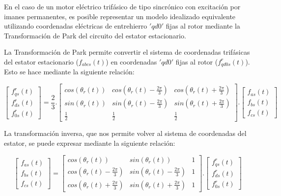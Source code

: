 \documentclass{article}
\begin{document}
    En el caso de un motor eléctrico trifásico de tipo sincrónico con excitación por imanes permanentes, 
    es posible representar un modelo idealizado equivalente utilizando coordenadas eléctricas de 
    entrehierro $'qd0'$ fijas al rotor mediante la Transformación de Park del circuito del estator 
    estacionario.

    La Transformación de Park permite convertir el sistema de coordenadas trifásicas del estator 
    estacionario ($f_{abcs}(t)$) en coordenadas $'qd0'$ fijas al rotor ($f^r_{qd0s}(t)$). Esto se hace 
    mediante la siguiente relación:

    \begin{equation}\label{eq:transformacion_de_park}
        \begin{bmatrix}
            f_{qs}^r(t)\\
            f_{ds}^r(t)\\
            f_{0s}^r(t)
        \end{bmatrix}
        =\frac{2}{3}.
        \begin{bmatrix}
            cos(\theta_r(t)) & cos(\theta_r(t) - \frac{2\pi}{3}) & cos(\theta_r(t) + \frac{2\pi}{3})\\
            sin(\theta_r(t)) & sin(\theta_r(t) - \frac{2\pi}{3}) & sin(\theta_r(t) + \frac{2\pi}{3})\\
            \frac{1}{2} & \frac{1}{2} & \frac{1}{2}
        \end{bmatrix}.
        \begin{bmatrix}
            f_{as}(t)\\
            f_{bs}(t)\\
            f_{cs}(t)
        \end{bmatrix}
    \end{equation}

    La transformación inversa, que nos permite volver al sistema de coordenadas del estator, se puede 
    expresar mediante la siguiente relación:
    
    \begin{equation}\label{eq:transformacion_de_park_inversa}
        \begin{bmatrix}
            f_{as}(t)\\
            f_{bs}(t)\\
            f_{cs}(t)
        \end{bmatrix}
        =
        \begin{bmatrix}
            cos(\theta_r(t)) & sin(\theta_r(t)) & 1\\
            cos(\theta_r(t) - \frac{2\pi}{3}) & sin(\theta_r(t) - \frac{2\pi}{3}) & 1\\
            cos(\theta_r(t) + \frac{2\pi}{3}) & sin(\theta_r(t) + \frac{2\pi}{3}) & 1
        \end{bmatrix}.
        \begin{bmatrix}
            f_{qs}^r(t)\\
            f_{ds}^r(t)\\
            f_{0s}^r(t)
        \end{bmatrix}
    \end{equation}
\end{document}
